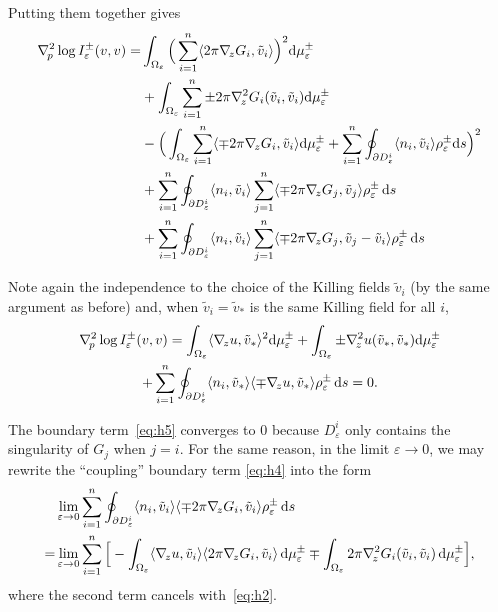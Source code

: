 \documentclass[a4paper]{amsart}
\newcommand{\Hess}{\nabla^2}
\newcommand{\dd}{{\rm d}}
\theoremstyle{plain} %
\theoremstyle{definition} %
\theoremstyle{remark}
\begin{document}
Putting them together gives
\begin{align}
	\Hess_{\! p} \log I^\pm_\varepsilon (v, v)
	=& \int_{\Omega_\varepsilon} \Big( \sum_{i=1}^n \langle 2\pi \nabla_{\! z} G_i, \tilde v_i \rangle \Big)^2 \dd\mu_\varepsilon^\pm \label{eq:h1}\\
&+ \int_{\Omega_\varepsilon} \sum_{i=1}^n \pm 2\pi \Hess_{\! z} G_i (\tilde v_i, \tilde v_i) \dd\mu_\varepsilon^\pm  \label{eq:h2}\\
	&- \Big(
		\int_{\Omega_\varepsilon} \sum_{i=1}^n \langle \mp 2\pi \nabla_{\! z} G_i, \tilde v_i \rangle \dd\mu_\varepsilon^\pm
		+ \sum_{i=1}^n \oint_{\partial D^i_\varepsilon} \langle n_i, \tilde v_i \rangle \rho_\varepsilon^\pm \dd s
	\Big)^2 \label{eq:h3}\\
	&+ \sum_{i=1}^n \oint_{\partial D^i_\varepsilon} \langle n_i, \tilde v_i \rangle \sum_{j=1}^n \langle \mp 2\pi \nabla_{\! z} G_j, \tilde v_j \rangle \rho_\varepsilon^\pm \, \dd s  \label{eq:h4}\\
	&+ \sum_{i=1}^n \oint_{\partial D^i_\varepsilon} \langle n_i, \tilde v_i \rangle \sum_{j=1}^n \langle \mp 2\pi \nabla_{\! z} G_j, \tilde v_j - \tilde v_i \rangle \rho_\varepsilon^\pm \, \dd s \label{eq:h5}
\end{align}

Note again the independence to the choice of the Killing fields $\tilde v_i$
(by the same argument as before) and, when $\tilde v_i = \tilde v_*$ is the
same Killing field for all $i$,
\begin{multline*}
	\Hess_{\! p} \log I^\pm_\varepsilon (v, v)
	= \int_{\Omega_\varepsilon} \langle \nabla_{\! z} u, \tilde v_* \rangle^2 \dd\mu_\varepsilon^\pm
	+ \int_{\Omega_\varepsilon} \pm \Hess_{\! z} u (\tilde v_*, \tilde v_*) \dd\mu_\varepsilon^\pm\\
	+ \sum_{i=1}^n \oint_{\partial D^i_\varepsilon} \langle n_i, \tilde v_* \rangle \langle \mp \nabla_{\! z} u, \tilde v_* \rangle \rho_\varepsilon^\pm \, \dd s = 0.
\end{multline*}

The boundary term~\eqref{eq:h5} converges to $0$ because
$D^i_\varepsilon$ only contains the singularity of $G_j$ when $j=i$.  For the
same reason, in the limit $\varepsilon \to 0$, we may rewrite the ``coupling''
boundary term \eqref{eq:h4} into the form
\begin{align*}
	&\lim_{\varepsilon \to 0} \sum_{i=1}^n \oint_{\partial D^i_\varepsilon} \langle n_i, \tilde v_i \rangle \langle \mp 2\pi \nabla_{\! z} G_i, \tilde v_i \rangle \rho_\varepsilon^\pm \, \dd s\\
	=&\lim_{\varepsilon \to 0} \sum_{i=1}^n \Big[
		- \int_{\Omega_\varepsilon} \langle \nabla_{\! z} u, \tilde v_i \rangle \langle 2\pi \nabla_{\! z} G_i, \tilde v_i \rangle \, \dd \mu_\varepsilon^\pm
		\mp \int_{\Omega_\varepsilon} 2\pi \Hess_{\! z} G_i (\tilde v_i, \tilde v_i) \, \dd \mu_\varepsilon^\pm
	\Big],
\end{align*}
where the second term cancels with~\eqref{eq:h2}.
\end{document}

